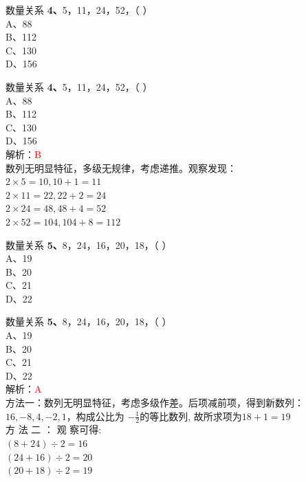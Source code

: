 \documentclass[aspectratio=169]{beamer}
\begin{document}
\begin{frame}[t]{数量关系}
    \textbf{4、}5，11，24，52，（ ）\\
    A、88 \\
    B、112\\
    C、130\\
    D、156\\
\end{frame}

\begin{frame}[t]{数量关系}
    \textbf{4、}5，11，24，52，（ ）\\
    A、88 \\
    B、112\\
    C、130\\
    D、156\\
    解析：\textcolor{red}{B}\\
    数列无明显特征，多级无规律，考虑递推。观察发现：\\
    $2 \times 5 = 10, 10+1=11$\\
    $2 \times 11 = 22, 22+2=24$\\
    $2 \times 24 = 48, 48+4=52$\\
    $2 \times 52 = 104, 104+8=112$\\
\end{frame}


\begin{frame}[t]{数量关系}
    \textbf{5、}8，24，16，20，18，（ ）\\
    A、19\\
    B、20\\
    C、21\\
    D、22\\
\end{frame}

\begin{frame}[t]{数量关系}
    \textbf{5、}8，24，16，20，18，（ ）\\
    A、19\\
    B、20\\
    C、21\\
    D、22\\
    解析：\textcolor{red}{A}\\
    方法一：数列无明显特征，考虑多级作差。后项减前项，得到新数列：\\
    $16, -8, 4, -2, 1$，构成公比为 $-\frac{1}{2}$的等比数列, 故所求项为$18+1=19$\\
    方 法 二 ： 观 察可得: \\
    $(8+24) \div 2 = 16$\\
    $(24+16) \div 2 = 20$\\
    $(20+18) \div 2 = 19$\\
\end{frame}
\end{document}
